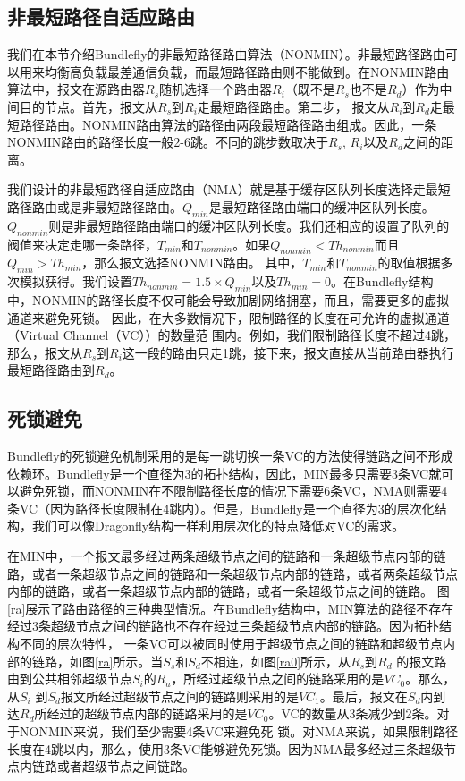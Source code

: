 \subsection{非最短路径自适应路由}

我们在本节介绍Bundlefly的非最短路径路由算法（NONMIN）。非最短路径路由可以用来均衡高负载最差通信负载，而最短路径路由则不能做到。在NONMIN路由算法中，报文在源路由器$R_s$随机选择一个路由器$R_i$（既不是$R_s$也不是$R_d$）作为中间目的节点。首先，报文从$R_s$到$R_i$走最短路径路由。第二步，
报文从$R_i$到$R_d$走最短路径路由。NONMIN路由算法的路径由两段最短路径路由组成。因此，一条NONMIN路由的路径长度一般2-6跳。不同的跳步数取决于$R_s$,
$R_i$以及$R_d$之间的距离。

我们设计的非最短路径自适应路由（NMA）就是基于缓存区队列长度选择走最短路径路由或是非最短路径路由。$Q_{min}$是最短路径路由端口的缓冲区队列长度。$Q_{nonmin}$则是非最短路径路由端口的缓冲区队列长度。我们还相应的设置了队列的阀值来决定走哪一条路径，$T_{min}$和$T_{nonmin}$。如果$Q_{nonmin}<Th_{nonmin}$而且$Q_{min}>Th_{min}$，那么报文选择NONMIN路由。
其中，$T_{min}$和$T_{nonmin}$的取值根据多次模拟获得。我们设置$Th_{nonmin}=1.5\times Q_{min}$以及$Th_{min}=0$。在Bundlefly结构中，NONMIN的路径长度不仅可能会导致加剧网络拥塞，而且，需要更多的虚拟通道来避免死锁。 因此，在大多数情况下，限制路径的长度在可允许的虚拟通道
（Virtual Channel（VC））的数量范
围内。例如，我们限制路径长度不超过4跳，那么，报文从$R_s$到$R_i$这一段的路由只走1跳，接下来，报文直接从当前路由器执行最短路径路由到$R_d$。

\subsection{死锁避免}

Bundlefly的死锁避免机制采用的是每一跳切换一条VC的方法使得链路之间不形成依赖环。Bundlefly是一个直径为3的拓扑结构，因此，MIN最多只需要3条VC就可以避免死锁，而NONMIN在不限制路径长度的情况下需要6条VC，NMA则需要4条VC（因为路径长度限制在4跳内）。但是，Bundlefly是一个直径为3的层次化结构，我们可以像Dragonfly结构一样利用层次化的特点降低对VC的需求。

在MIN中，一个报文最多经过两条超级节点之间的链路和一条超级节点内部的链路，或者一条超级节点之间的链路和一条超级节点内部的链路，或者两条超级节点内部的链路，或者一条超级节点内部的链路，或者一条超级节点之间的链路。
图\ref{ra}展示了路由路径的三种典型情况。在Bundlefly结构中，MIN算法的路径不存在经过3条超级节点之间的链路也不存在经过三条超级节点内部的链路。因为拓扑结构不同的层次特性，
一条VC可以被同时使用于超级节点之间的链路和超级节点内部的链路，如图\ref{ra}所示。当$S_s$和$S_d$不相连，如图\ref{ra0}所示，从$R_s$到$R_d$
的报文路由到公共相邻超级节点$S_i$的$R_a$，所经过超级节点之间的链路采用的是$VC_0$。那么，从$S_i$ 到$S_d$报文所经过超级节点之间的链路则采用的是$VC_1$。最后，报文在$S_d$内到达$R_d$所经过的超级节点内部的链路采用的是$VC_0$。VC的数量从3条减少到2条。对于NONMIN来说，我们至少需要4条VC来避免死
锁。对NMA来说，如果限制路径长度在4跳以内，那么，使用3条VC能够避免死锁。因为NMA最多经过三条超级节点内链路或者超级节点之间链路。

